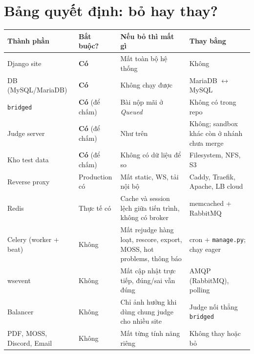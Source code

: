 \documentclass[11pt,a4paper]{article}
\renewcommand{\c}[1]{\texttt{#1}}
\begin{document}
\section{Bảng quyết định: bỏ hay thay?}
\begin{center}\small
\begin{tabularx}{\textwidth}{@{}>{\raggedright}p{3.3cm}>{\centering}p{2.2cm}>{\raggedright}X>{\raggedright\arraybackslash}p{4.3cm}@{}}
\toprule
Thành phần & Bắt buộc? & Nếu bỏ thì mất gì & Thay bằng \\
\midrule
Django site & \textbf{Có} & Mất toàn bộ hệ thống & Không \\
DB (MySQL/MariaDB) & \textbf{Có} & Không chạy được & MariaDB $\leftrightarrow$ MySQL \\
\c{bridged} & \textbf{Có} (để chấm) & Bài nộp mãi ở \emph{Queued} & Không có trong repo \\
Judge server & \textbf{Có} (để chấm) & Như trên & Không; sandbox khác còn ở nhánh chưa merge \\
Kho test data & \textbf{Có} (để chấm) & Không có dữ liệu để so & Filesystem, NFS, S3 \\
Reverse proxy & Production có & Mất static, WS, tải nội bộ & Caddy, Traefik, Apache, LB cloud \\
Redis & Thực tế có & Cache và session lệch giữa tiến trình, không có broker & memcached + RabbitMQ \\
Celery (worker + beat) & Không & Mất rejudge hàng loạt, rescore, export, MOSS, hot problems, thông báo & cron + \c{manage.py}; chạy eager \\
wsevent & Không & Mất cập nhật trực tiếp, đúng/sai vẫn đúng & AMQP (RabbitMQ), polling \\
Balancer & Không & Chỉ ảnh hưởng khi dùng chung judge cho nhiều site & Judge nối thẳng \c{bridged} \\
PDF, MOSS, Discord, Email & Không & Mất từng tính năng riêng & Không thay hoặc bỏ \\
\bottomrule
\end{tabularx}
\end{center}
\end{document}
